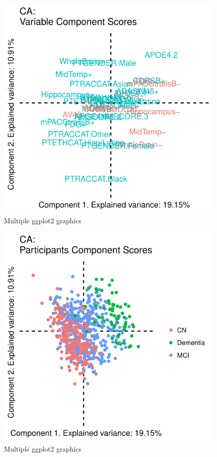 \documentclass[]{article}
\begin{document}
\begin{figure}[H]

{\centering \includegraphics{1_a_Simple_RMarkdown_PDF_files/figure-latex/unnamed-chunk-2-1} 

}

\caption{Multiple ggplot2 graphics}\label{fig:unnamed-chunk-21}
\end{figure}
\begin{figure}[H]

{\centering \includegraphics{1_a_Simple_RMarkdown_PDF_files/figure-latex/unnamed-chunk-2-2} 

}

\caption{Multiple ggplot2 graphics}\label{fig:unnamed-chunk-22}
\end{figure}
\end{document}
